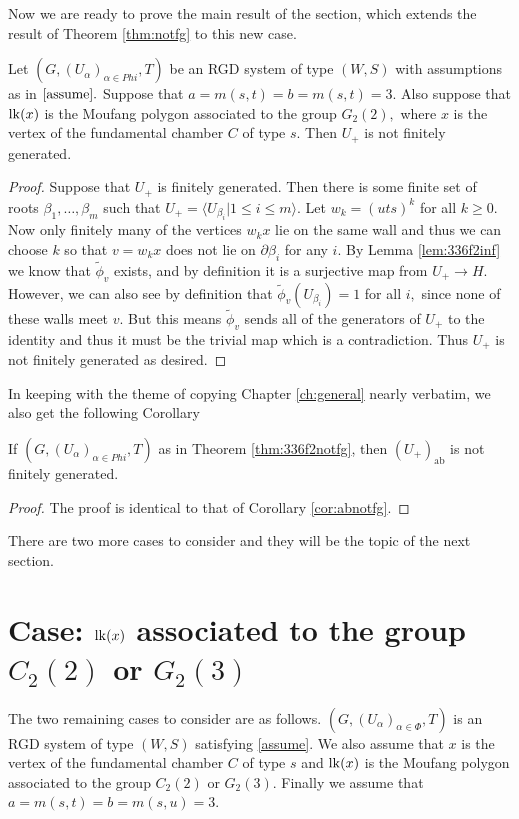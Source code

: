 \documentclass[class=book, crop=false]{standalone}
\begin{document}
Now we are ready to prove the main result of the section, which extends the result of Theorem \ref{thm:notfg} to this new case.
\begin{theorem}
	\label{thm:336f2notfg}
	Let $(G,(U_\alpha)_{\alpha\in Phi},T)$ be an RGD system of type $(W,S)$ with assumptions as in $\eqref{assume}.$ Suppose that $a=m(s,t)=b=m(s,t)=3.$ Also suppose that $\mathrm{lk}(x)$ is the Moufang polygon associated to the group $G_2(2),$ where $x$ is the vertex of the fundamental chamber $C$ of type $s.$ Then $U_+$ is not finitely generated.
\end{theorem}
\begin{proof}
	Suppose that $U_+$ is finitely generated. Then there is some finite set of roots $\beta_1,\dots,\beta_m$ such that $U_+=\langle U_{\beta_i}|1\le i\le m\rangle.$ Let $w_k=(uts)^k$ for all $k\ge 0.$ Now only finitely many of the vertices $w_kx$ lie on the same wall and thus we can choose $k$ so that $v=w_kx$ does not lie on $\partial \beta_i$ for any $i.$ By Lemma \ref{lem:336f2inf} we know that $\tilde{\phi}_v$ exists, and by definition it is a surjective map from $U_+\to H.$ However, we can also see by definition that $\tilde{\phi}_v(U_{\beta_i})=1$ for all $i,$ since none of these walls meet $v.$ But this means $\tilde{\phi}_v$ sends all of the generators of $U_+$ to the identity and thus it must be the trivial map which is a contradiction. Thus $U_+$ is not finitely generated as desired.
\end{proof}

In keeping with the theme of copying Chapter \ref{ch:general} nearly verbatim, we also get the following Corollary
\begin{cor}
	If $(G,(U_\alpha)_{\alpha\in Phi},T)$ as in Theorem \ref{thm:336f2notfg}, then $(U_+)_{\text{ab}}$ is not finitely generated.
\end{cor}
\begin{proof}
	The proof is identical to that of Corollary \ref{cor:abnotfg}.
\end{proof}

There are two more cases to consider and they will be the topic of the next section.

\section{Case: $\mathrm{lk}(x)$ associated to the group $C_2(2)$ or $G_2(3)$}
The two remaining cases to consider are as follows. $(G,(U_\alpha)_{\alpha\in \Phi},T)$ is an RGD system of type $(W,S)$ satisfying \eqref{assume}. We also assume that $x$ is the vertex of the fundamental chamber $C$ of type $s$ and $\mathrm{lk}(x)$ is the Moufang polygon associated to the group $C_2(2)$ or $G_2(3).$ Finally we assume that $a=m(s,t)=b=m(s,u)=3.$
\end{document}
